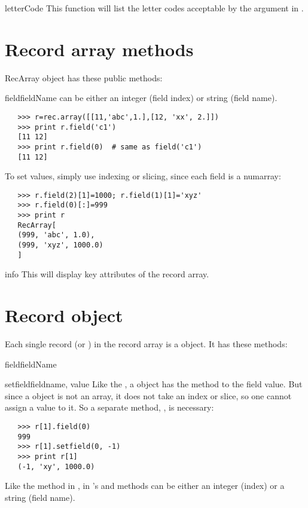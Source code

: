 \begin{funcdesc}{letterCode}{}
   This function will list the letter codes acceptable by the  
   argument in .
\end{funcdesc}

\section{Record array methods}
\label{sec:recarray-methods}
RecArray object has these public methods:

\begin{methoddesc}[RecArray]{field}{fieldName}
    can be either an integer (field index) or string 
   (field name).
   \begin{verbatim}
   >>> r=rec.array([[11,'abc',1.],[12, 'xx', 2.]])
   >>> print r.field('c1')
   [11 12]
   >>> print r.field(0)  # same as field('c1')
   [11 12]
   \end{verbatim}
   To set values, simply use indexing or slicing, since each field is a 
   numarray:
   \begin{verbatim}
   >>> r.field(2)[1]=1000; r.field(1)[1]='xyz'
   >>> r.field(0)[:]=999
   >>> print r
   RecArray[ 
   (999, 'abc', 1.0),
   (999, 'xyz', 1000.0)
   ]
   \end{verbatim}
\end{methoddesc}
\begin{methoddesc}[RecArray]{info}{}
   This will display key attributes of the record array.
\end{methoddesc}

\section{Record object}
\label{sec:recarray-record}
Each single record (or ) in the record array is a 
 object.  It has these methods:

\begin{methoddesc}[Record]{field}{fieldName}
\end{methoddesc}
\begin{methoddesc}[Record]{setfield}{fieldname, value}
   Like the , a  object has the  
   method to  the field value.  But since a  object 
   is not an array, it does not take an index or slice, so one cannot 
   assign a value to it.  So a separate  method, , 
   is necessary:
   \begin{verbatim}
   >>> r[1].field(0)
   999
   >>> r[1].setfield(0, -1)
   >>> print r[1]
   (-1, 'xy', 1000.0)
   \end{verbatim}
   Like the  method in ,  in 
   's  and  methods can be 
   either an integer (index) or a string (field name).
\end{methoddesc}



